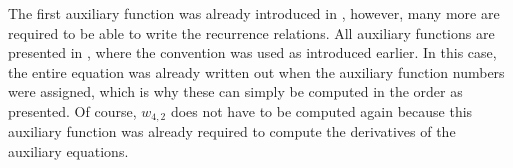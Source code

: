 
The first auxiliary function was already introduced in , however, many more are required to be able to write the recurrence relations. All auxiliary functions are presented in , where the convention was used as introduced earlier. In this case, the entire equation was already written out when the auxiliary function numbers were assigned, which is why these can simply be computed in the order as presented. Of course, $w_{4,2}$ does not have to be computed again because this auxiliary function was already required to compute the derivatives of the auxiliary equations.


